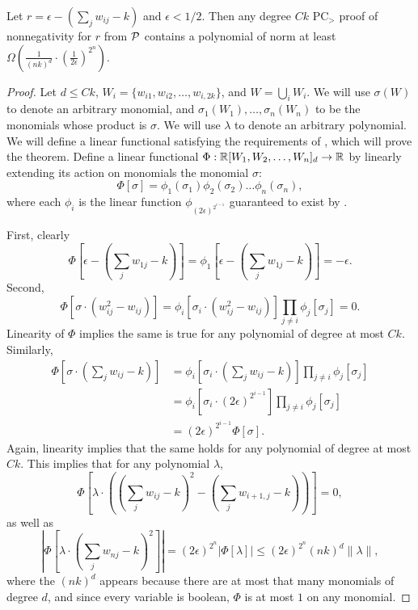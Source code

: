 \begin{lemma}\label{lem:boolean-complex}
Let $r = \epsilon - \left(\sum_j w_{ij} - k\right)$ and $\epsilon < 1/2$. Then any degree $Ck$ PC$_>$ proof of nonnegativity for $r$ from $\mathcal P$ contains a polynomial of norm at least $\Omega\left(\frac{1}{(nk)^d} \cdot \left(\frac{1}{2\epsilon}\right)^{2^n}\right)$.
\end{lemma}
\begin{proof}
Let $d \leq Ck$, $W_i = \{w_{i1}, w_{i2}, \dots, w_{i,2k}\}$, and $W = \bigcup_i W_i$. We will use $\sigma(W)$ to denote an arbitrary monomial, and $\sigma_1(W_1),\dots,\sigma_n(W_n)$ to be the monomials whose product is $\sigma$. We will use $\lambda$ to denote an arbitrary polynomial. We will define a linear functional satisfying the requirements of , which will prove the theorem. Define a linear functional $\Phi: \mathbb R[W_1,W_2,\dots,W_n]_d \rightarrow \mathbb R$ by linearly extending its action on monomials the monomial $\sigma$:
\[\Phi[\sigma] = \phi_1(\sigma_1)\phi_2(\sigma_2)\dots\phi_n(\sigma_n),\]
where each $\phi_i$ is the linear function $\phi_{(2\epsilon)^{2^{i-1}}}$ guaranteed to exist by .

First, clearly 
\[\Phi\left[\epsilon - \left(\sum_j w_{1j} - k\right)\right] = \phi_1\left[\epsilon - \left(\sum_j w_{1j} - k\right)\right] = -\epsilon.\]
Second, 
\[\Phi[\sigma\cdot(w_{ij}^2 - w_{ij})] = \phi_i[\sigma_i\cdot (w_{ij}^2 - w_{ij})]\prod_{j \neq i}\phi_j[\sigma_j] = 0.\] 
Linearity of $\Phi$ implies the same is true for any polynomial of degree at most $Ck$. Similarly, 
\begin{align*}
\Phi[\sigma\cdot\left(\sum_j w_{ij} - k\right)] &= \phi_i[\sigma_i \cdot \left(\sum_j w_{ij} - k\right)]\prod_{j \neq i}\phi_j[\sigma_j] \\
&= \phi_i[\sigma_i \cdot (2\epsilon)^{2^{i-1}}] \prod_{j \neq i}\phi_j[\sigma_j] \\
&= (2\epsilon)^{2^{i-1}} \Phi[\sigma].
\end{align*}
Again, linearity implies that the same holds for any polynomial of degree at most $Ck$. This implies that for any polynomial $\lambda$, 
\[\Phi[\lambda\cdot \left((\sum_{j} w_{ij} - k)^2 - (\sum_j w_{i+1,j} - k)\right)] = 0,\]
as well as
\[\left|\Phi[\lambda \cdot \left(\sum_j w_{nj} - k\right)^2]\right| = (2\epsilon)^{2^n}\left|\Phi[\lambda]\right| \leq (2\epsilon)^{2^n}(nk)^d\|\lambda\|,\]
where the $(nk)^d$ appears because there are at most that many monomials of degree $d$, and since every variable is boolean, $\Phi$ is at most $1$ on any monomial. 


\end{proof}
